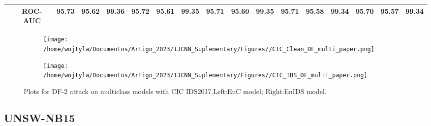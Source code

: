 \documentclass[conference]{IEEEtran}
\begin{document}
\begin{table}[H]
\begin{tabular}{|c|c|c|c|c|c|c|c|c|c|c|c|c|c|c|c|c|}
			& ROC-AUC & \cellcolor{yellow!50}95.73 & \cellcolor{yellow!50}95.62 & \cellcolor{yellow!50}99.36 & \cellcolor{yellow!50}95.72 & \cellcolor{yellow!50}95.61 & \cellcolor{yellow!50}99.35 & \cellcolor{yellow!50}95.71 & \cellcolor{yellow!50}95.60 & \cellcolor{yellow!50}99.35 & \cellcolor{yellow!50}95.71 & \cellcolor{yellow!50}95.58 & \cellcolor{yellow!50}99.34 & \cellcolor{yellow!50}95.70 & \cellcolor{yellow!50}95.57 & \cellcolor{yellow!50}99.34
			\\
			\hline
		\end{tabular}	
	\end{table}
	
	\begin{figure}[H]
		\centering
		\begin{subfigure}[b]{0.45\textwidth}
			\texttt{[image: /home/wojtyla/Documentos/Artigo\_2023/IJCNN\_Suplementary/Figures//CIC\_Clean\_DF\_multi\_paper.png]}
			\label{fig:1}
		\end{subfigure}
		\hfill
		\begin{subfigure}[b]{0.45\textwidth}
			\texttt{[image: /home/wojtyla/Documentos/Artigo\_2023/IJCNN\_Suplementary/Figures//CIC\_IDS\_DF\_multi\_paper.png]}
			\label{fig:4}
		\end{subfigure}
		\caption{Plots for DF-2 attack on multiclass models with CIC IDS2017.Left:EnC model; Right:EnIDS model.}
		\label{fig:cic_df_multi}
	\end{figure}
	
	\subsection{UNSW-NB15}
	
\end{document}
